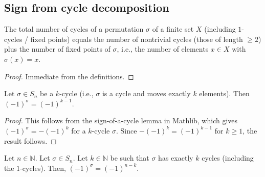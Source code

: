 \subsection{Sign from cycle decomposition}

\begin{lemma}
\label{lem.numCyclesTotal}
\leanhelper
\leanok
The total number of cycles of a permutation $\sigma$ of a finite set $X$
(including $1$-cycles / fixed points) equals the number of nontrivial cycles
(those of length $\geq 2$) plus the number of fixed points of $\sigma$,
i.e., the number of elements $x \in X$ with $\sigma(x) = x$.
\end{lemma}

\begin{proof}
\leanok
Immediate from the definitions.
\end{proof}

\begin{lemma}
\label{lem.sign_cycle}
\leanhelper
\leanok
Let $\sigma \in S_n$ be a $k$-cycle (i.e., $\sigma$ is a cycle and moves
exactly $k$ elements). Then
$(-1)^{\sigma} = (-1)^{k-1}$.
\end{lemma}

\begin{proof}
\leanok
This follows from the sign-of-a-cycle lemma in Mathlib, which gives
$(-1)^{\sigma} = -(-1)^{k}$ for a $k$-cycle $\sigma$.
Since $-(-1)^k = (-1)^{k-1}$ for $k \geq 1$, the result follows.
\end{proof}

\begin{proposition}
\label{prop.perm.cycs.sign}
\leantarget
\leanok
Let $n\in\mathbb{N}$. Let $\sigma\in S_{n}$. Let
$k\in\mathbb{N}$ be such that $\sigma$ has exactly $k$ cycles (including the
$1$-cycles). Then, $\left(  -1\right)  ^{\sigma}=\left(  -1\right)  ^{n-k}$.
\end{proposition}

